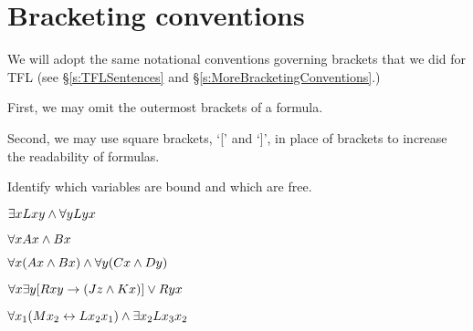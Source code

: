 \section{Bracketing conventions}

We will adopt the same notational conventions governing brackets that we did for TFL (see \S\ref{s:TFLSentences} and \S\ref{s:MoreBracketingConventions}.) 

First, we may omit the outermost brackets of a formula. 

Second, we may use square brackets, `[' and `]', in place of brackets to increase the readability of formulas. 



\practiceproblems
\problempart
\label{pr.freeFOL}
Identify which variables are bound and which are free.
\begin{earg}
\item $\exists x Lxy \wedge \forall y Lyx$
\item $\forall x Ax \wedge Bx$
\item $\forall x (Ax \wedge Bx) \wedge \forall y(Cx \wedge Dy)$
\item $\forall x\exists y[Rxy \rightarrow (Jz \wedge Kx)] \vee Ryx$
\item $\forall x_1(Mx_2 \leftrightarrow Lx_2x_1) \wedge \exists x_2 Lx_3x_2$
\end{earg}
